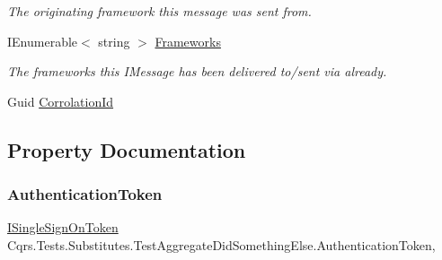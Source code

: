 \begin{DoxyCompactItemize}
\begin{DoxyCompactList}\small\item\em The originating framework this message was sent from. \end{DoxyCompactList}\item 
I\+Enumerable$<$ string $>$ \hyperlink{classCqrs_1_1Tests_1_1Substitutes_1_1TestAggregateDidSomethingElse_a8228b8609d22f06ba64402a540c3a04c_a8228b8609d22f06ba64402a540c3a04c}{Frameworks}
\begin{DoxyCompactList}\small\item\em The frameworks this I\+Message has been delivered to/sent via already. \end{DoxyCompactList}\item 
Guid \hyperlink{classCqrs_1_1Tests_1_1Substitutes_1_1TestAggregateDidSomethingElse_aded1f13734fad759eca00404533ffe1e_aded1f13734fad759eca00404533ffe1e}{Corrolation\+Id}
\end{DoxyCompactItemize}


\subsection{Property Documentation}
\mbox{\label{classCqrs_1_1Tests_1_1Substitutes_1_1TestAggregateDidSomethingElse_a9b928c04b9de3c27c986af74e96dc80b_a9b928c04b9de3c27c986af74e96dc80b}} 
\subsubsection{\texorpdfstring{Authentication\+Token}{AuthenticationToken}}
{\footnotesize\ttfamily \hyperlink{interfaceCqrs_1_1Authentication_1_1ISingleSignOnToken}{I\+Single\+Sign\+On\+Token} Cqrs.\+Tests.\+Substitutes.\+Test\+Aggregate\+Did\+Something\+Else.\+Authentication\+Token\hspace{0.3cm}{\ttfamily [get]}, {\ttfamily [set]}}

